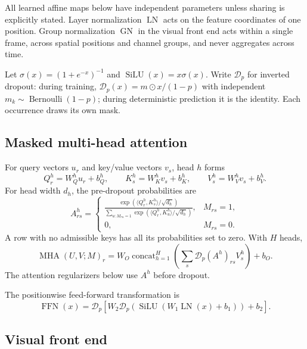 \documentclass[11pt,a4paper]{article}
\newcommand{\LN}{\operatorname{LN}}
\newcommand{\GN}{\operatorname{GN}}
\newcommand{\MHA}{\operatorname{MHA}}
\newcommand{\FFN}{\operatorname{FFN}}
\newcommand{\silu}{\operatorname{SiLU}}
\DeclareMathOperator{\concat}{concat}
\numberwithin{equation}{section}
\begin{document}
All learned affine maps below have independent parameters unless sharing
is explicitly stated. Layer normalization $\LN$ acts on the feature
coordinates of one position. Group normalization $\GN$ in the visual
front end acts within a single frame, across spatial positions and
channel groups, and never aggregates across time.

Let $\sigma(x)=(1+e^{-x})^{-1}$ and $\silu(x)=x\sigma(x)$.
Write $\mathcal D_p$ for inverted dropout: during training,
$\mathcal D_p(x)=m\odot x/(1-p)$ with independent
$m_k\sim\operatorname{Bernoulli}(1-p)$; during deterministic
prediction it is the identity. Each occurrence draws its own mask.

\subsection{Masked multi-head attention}

For query vectors $u_r$ and key/value vectors $v_s$, head $h$ forms
\begin{equation}
Q_r^{h}=W_Q^{h}u_r+b_Q^{h},\qquad
K_s^{h}=W_K^{h}v_s+b_K^{h},\qquad
V_s^{h}=W_V^{h}v_s+b_V^{h}.
\end{equation}
For head width $d_h$, the pre-dropout probabilities are
\begin{equation}
A^{h}_{rs}=
\begin{cases}
\displaystyle
\frac{\exp(\langle Q_r^{h},K_s^{h}\rangle/\sqrt{d_h})}
 {\sum_{u:M_{ru}=1}\exp(\langle Q_r^{h},K_u^{h}\rangle/\sqrt{d_h})},
 & M_{rs}=1,\\[1.2em]
0, & M_{rs}=0.
\end{cases}
\label{eq:attention}
\end{equation}
A row with no admissible keys has all its probabilities set to zero.
With $H$ heads,
\begin{equation}
\MHA(U,V;M)_r
=W_O\concat_{h=1}^{H}\left(
 \sum_s\mathcal D_p(A^h)_{rs}V_s^h\right)+b_O.
\end{equation}
The attention regularizers below use $A^h$ before dropout.

The positionwise feed-forward transformation is
\begin{equation}
\FFN(x)=\mathcal D_p\!\left[
 W_2\mathcal D_p\!\left(\silu(W_1\LN(x)+b_1)\right)+b_2
\right].
\label{eq:ffn}
\end{equation}

\subsection{Visual front end}
\end{document}
